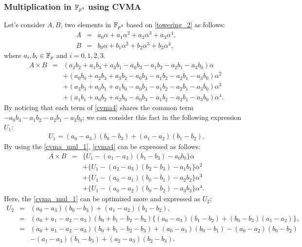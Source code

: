 \subsubsection{Multiplication in \texorpdfstring{$\mathbb{F}_{p^4}$}{} using CVMA}
Let's consider $A,B$, two elements in $ \mathbb{F}_{p^4}$ based on \eqref{towering_2} as follows:
\begin{eqnarray*}
	A&=&a_0\alpha+a_1\alpha^2+a_2\alpha^3+a_3\alpha^4,\\
	B&=&b_0\alpha+b_1\alpha^2+b_2\alpha^3+b_3\alpha^4,
\end{eqnarray*}
where $a_i, b_i \in {\mathbb{F}}_{p}$ and $i={0,1,2,3}$.
\begin{eqnarray}
A\!\times\!B&= &(a_2b_2\!+a_1b_3\!+a_3b_1\!-a_0b_3\!-a_1b_2-a_2b_1\!-a_3b_0)\alpha \nonumber\\
&&+(a_0b_0\!+a_2b_3\!+a_3b_2\!-a_0b_3\!-a_1b_2-a_2b_1\!-a_3b_0)\alpha^2 \nonumber\\
&&+(a_3b_3\!+a_0b_1\!+a_1b_0\!-a_0b_3\!-a_1b_2-a_2b_1\!-a_3b_0)\alpha^3 \nonumber\\
&&+(a_1b_1\!+a_0b_2\!+a_2b_0\!-a_0b_3\!-a_1b_2-a_2b_1\!-a_3b_0)\alpha^4. \label{cvma4}
\end{eqnarray}
By noticing that each term of \eqref{cvma4}  shares the common term $-a_0b_3-a_1b_2-a_2b_1-a_3b_0$; we can  consider this fact in the following expression $U_1$:
\begin{eqnarray}
U_1=(a_0-a_3)(b_0-b_3)+(a_1-a_2)(b_1-b_2)\label{cvma_mul_1}.
\end{eqnarray}
By using the \eqref{cvma_mul_1}, \eqref{cvma4} can be expressed as follows:
\begin{eqnarray}\label{cvma5}
A\!\times\!B&=&\{U_1-(a_1-a_3)(b_1-b_3)-a_0b_0\}\alpha\nonumber\\
&&+\{U_1-(a_2-a_3)(b_2-b_3)-a_1b_1\}\alpha^2\nonumber\\
&&+\{U_1-(a_0-a_1)(b_0-b_1)-a_2b_2\}\alpha^3\nonumber\\
&&+\{U_1-(a_0-a_2)(b_0-b_2)-a_3b_3\}\alpha^4.
\end{eqnarray}
Here, the \eqref{cvma_mul_1} can be optimized more and expressed as $U_2$:
\begin{eqnarray*}
U_2&=&(a_0-a_3)(b_0-b_3)+(a_1-a_2)(b_1-b_2),\\
&=&(a_0+a_1-a_2-a_3)(b_0+b_1-b_2-b_3)\{(a_0-a_3)(b_1-b_2)+(b_0-b_3)(a_1-a_2)\},\\
&=&(a_0+a_1-a_2-a_3)(b_0+b_1-b_2-b_3)+(a_0-a_1)(b_0-b_1)-(a_0-a_2)(b_0-b_2)\\
&&-(a_1-a_3)(b_1-b_3)+(a_2-a_3)(b_2-b_3).
\end{eqnarray*}
